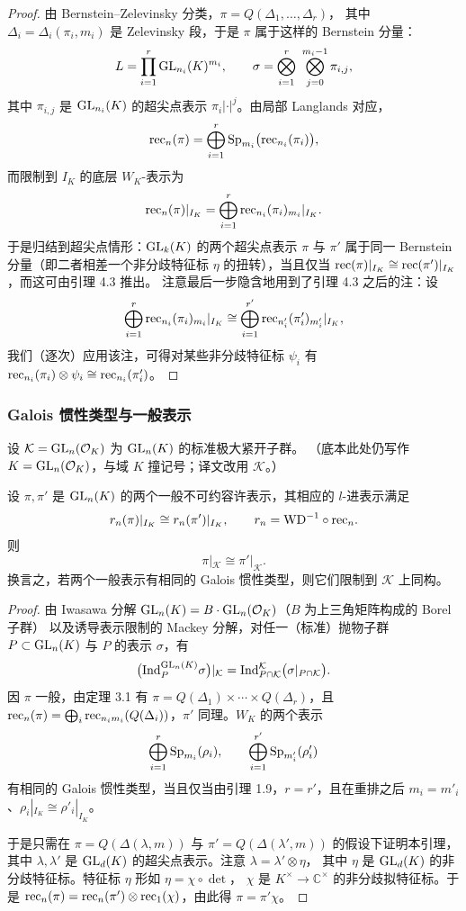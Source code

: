\begin{proof}
由 Bernstein--Zelevinsky 分类，$\pi=Q(\Delta_1,\dots,\Delta_r)$，
其中 $\Delta_i=\Delta_i(\pi_i,m_i)$ 是 Zelevinsky 段，于是 $\pi$ 属于这样的 Bernstein 分量：
\[
L=\prod_{i=1}^{r}\mathrm{GL}_{n_i}(K)^{m_i},
\qquad
\sigma=\bigotimes_{i=1}^{r}\ \bigotimes_{j=0}^{m_i-1}\pi_{i,j},
\]
其中 $\pi_{i,j}$ 是 $\mathrm{GL}_{n_i}(K)$ 的超尖点表示 $\pi_i|\cdot|^{j}$。由局部 Langlands 对应，
\[
\mathrm{rec}_n(\pi)=\bigoplus_{i=1}^{r}\mathrm{Sp}_{m_i}\bigl(\mathrm{rec}_{n_i}(\pi_i)\bigr),
\]
而限制到 $I_K$ 的底层 $W_K$-表示为
\[
\mathrm{rec}_n(\pi)|_{I_K}=\bigoplus_{i=1}^{r}\mathrm{rec}_{n_i}(\pi_i)_{m_i}|_{I_K}.
\]
于是归结到超尖点情形：$\mathrm{GL}_k(K)$ 的两个超尖点表示 $\pi$ 与 $\pi'$ 属于同一
Bernstein 分量（即二者相差一个非分歧特征标 $\eta$ 的扭转），当且仅当
$\mathrm{rec}(\pi)|_{I_K}\cong\mathrm{rec}(\pi')|_{I_K}$，而这可由引理 4.3 推出。
注意最后一步隐含地用到了引理 4.3 之后的注：设
\[
\bigoplus_{i=1}^{r}\mathrm{rec}_{n_i}(\pi_i)_{m_i}|_{I_K}\cong
\bigoplus_{i=1}^{r'}\mathrm{rec}_{n'_i}(\pi'_i)_{m'_i}|_{I_K},
\]
我们（逐次）应用该注，可得对某些非分歧特征标 $\psi_i$ 有
$\mathrm{rec}_{n_i}(\pi_i)\otimes\psi_i\cong\mathrm{rec}_{n_i}(\pi'_i)$。
\end{proof}

\subsubsection{Galois 惯性类型与一般表示}

设 $\mathcal{K}=\mathrm{GL}_n(\mathcal{O}_K)$ 为 $\mathrm{GL}_n(K)$ 的标准极大紧开子群。
（底本此处仍写作 $K=\mathrm{GL}_n(\mathcal{O}_K)$，与域 $K$ 撞记号；译文改用 $\mathcal{K}$。）

\begin{lemma}
设 $\pi,\pi'$ 是 $\mathrm{GL}_n(K)$ 的两个一般不可约容许表示，其相应的 $l$-进表示满足
\[
r_n(\pi)|_{I_K}\cong r_n(\pi')|_{I_K},
\qquad r_n=\mathrm{WD}^{-1}\circ\mathrm{rec}_n .
\]
则
\[
\pi|_{\mathcal{K}}\cong\pi'|_{\mathcal{K}} .
\]
换言之，若两个一般表示有相同的 Galois 惯性类型，则它们限制到 $\mathcal{K}$ 上同构。
\end{lemma}

\begin{proof}
由 Iwasawa 分解 $\mathrm{GL}_n(K)=B\cdot\mathrm{GL}_n(\mathcal{O}_K)$（$B$ 为上三角矩阵构成的 Borel 子群）
以及诱导表示限制的 Mackey 分解，对任一（标准）抛物子群 $P\subset\mathrm{GL}_n(K)$
与 $P$ 的表示 $\sigma$，有
\[
\bigl(\mathrm{Ind}^{\mathrm{GL}_n(K)}_P\sigma\bigr)|_{\mathcal{K}}
=\mathrm{Ind}^{\mathcal{K}}_{P\cap\mathcal{K}}\bigl(\sigma|_{P\cap\mathcal{K}}\bigr).
\]
因 $\pi$ 一般，由定理 3.1 有 $\pi=Q(\Delta_1)\times\cdots\times Q(\Delta_r)$，且
$\mathrm{rec}_n(\pi)=\bigoplus_i\mathrm{rec}_{n_im_i}(Q(\Delta_i))$，$\pi'$ 同理。$W_K$ 的两个表示
\[
\bigoplus_{i=1}^{r}\mathrm{Sp}_{m_i}(\rho_i),
\qquad
\bigoplus_{i=1}^{r'}\mathrm{Sp}_{m'_i}(\rho'_i)
\]
有相同的 Galois 惯性类型，当且仅当由引理 1.9，$r=r'$，且在重排之后
$m_i=m'_i$、$\rho_i|_{I_K}\cong\rho'_i|_{I_K}$。

于是只需在 $\pi=Q(\Delta(\lambda,m))$ 与 $\pi'=Q(\Delta(\lambda',m))$ 的假设下证明本引理，
其中 $\lambda,\lambda'$ 是 $\mathrm{GL}_d(K)$ 的超尖点表示。注意 $\lambda=\lambda'\otimes\eta$，
其中 $\eta$ 是 $\mathrm{GL}_d(K)$ 的非分歧特征标。特征标 $\eta$ 形如 $\eta=\chi\circ\det$，
$\chi$ 是 $K^{\times}\to\mathbb{C}^{\times}$ 的非分歧拟特征标。于是
$\mathrm{rec}_n(\pi)=\mathrm{rec}_n(\pi')\otimes\mathrm{rec}_1(\chi)$，由此得 $\pi=\pi'\chi$。
\end{proof}

